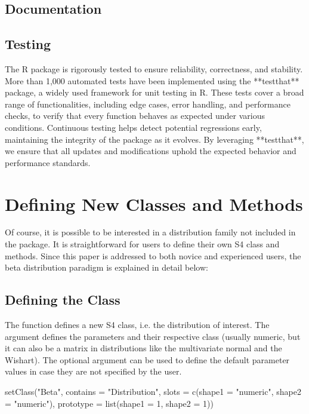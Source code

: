 \documentclass[nojss]{jss}
\newcommand{\fct}[1]{\code{#1()}}
\begin{document}
\subsection[Documentation]{Documentation}

\subsection[Testing]{Testing}

The R package is rigorously tested to ensure reliability, correctness, and stability. More than 1,000 automated tests have been implemented using the **testthat** package, a widely used framework for unit testing in R. These tests cover a broad range of functionalities, including edge cases, error handling, and performance checks, to verify that every function behaves as expected under various conditions. Continuous testing helps detect potential regressions early, maintaining the integrity of the package as it evolves. By leveraging **testthat**, we ensure that all updates and modifications uphold the expected behavior and performance standards.

\section[Defining New Classes and Methods]{Defining New Classes and Methods} \label{s:new}

Of course, it is possible to be interested in a distribution family not included in the package. It is straightforward for users to define their own S4 class and methods. Since this paper is addressed to both novice and experienced  users, the beta distribution paradigm is explained in detail below:

\subsection[Defining the Class]{Defining the Class}

The \fct{setClass} function defines a new S4 class, i.e. the distribution of interest. The  argument defines the parameters and their respective class (usually numeric, but it can also be a matrix in distributions like the multivariate normal and the Wishart). The optional argument  can be used to define the default parameter values in case they are not specified by the user.

\begin{CodeChunk}
\begin{CodeInput}
setClass("Beta",
  contains = "Distribution",
  slots = c(shape1 = "numeric", shape2 = "numeric"),
  prototype = list(shape1 = 1, shape2 = 1))
\end{CodeInput}
\end{CodeChunk}
\end{document}
